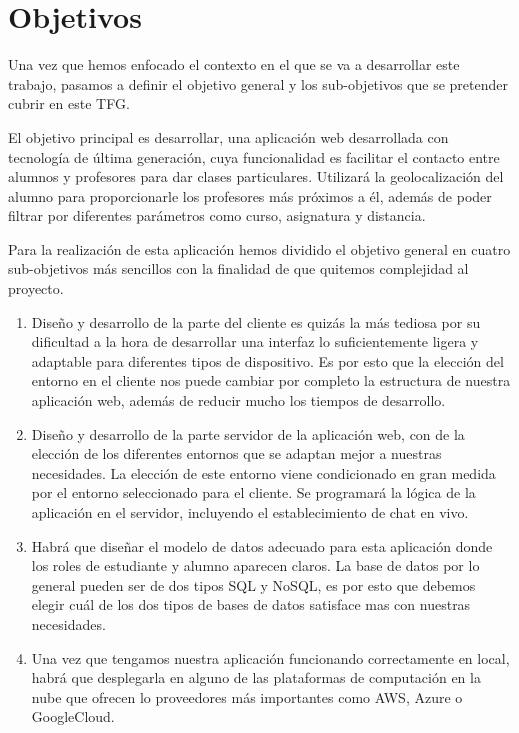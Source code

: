 \chapter{Objetivos}
Una vez que hemos enfocado el contexto en el que se va a desarrollar este trabajo, pasamos a definir el objetivo general y los sub-objetivos que se pretender cubrir en este TFG.

El objetivo principal es desarrollar, una aplicación web desarrollada con tecnología de última  generación, cuya funcionalidad es facilitar el contacto entre alumnos y profesores para dar clases particulares. Utilizará la geolocalización del alumno para proporcionarle los profesores más próximos a él, además de poder filtrar por diferentes parámetros como curso, asignatura y distancia.

Para la realización de esta aplicación hemos dividido el objetivo general en cuatro sub-objetivos más sencillos con la finalidad de que quitemos complejidad al proyecto.
\begin{enumerate}

    \item Diseño y desarrollo de la parte del cliente es quizás la más tediosa por su dificultad a la hora de desarrollar una interfaz lo suficientemente ligera y adaptable para diferentes tipos de dispositivo. Es por esto que la elección del entorno en el cliente nos puede cambiar por completo la estructura de nuestra aplicación web, además de reducir mucho los tiempos de desarrollo.

    \item Diseño y desarrollo de la parte servidor de la aplicación web, con de la elección de los diferentes entornos que se adaptan mejor a nuestras necesidades. La elección de este entorno viene condicionado en gran medida por el entorno seleccionado para el cliente. Se programará la lógica de la aplicación en el servidor, incluyendo el establecimiento de chat en vivo.

    \item Habrá que diseñar el modelo de datos adecuado para esta aplicación donde los roles de estudiante y alumno aparecen claros. La base de datos por lo general pueden ser de dos tipos SQL y NoSQL, es por esto que debemos elegir cuál de los dos tipos de bases de datos satisface mas con nuestras necesidades.

    \item Una vez que tengamos nuestra aplicación funcionando correctamente en local, habrá que desplegarla en alguno de las plataformas de computación en la nube que ofrecen lo proveedores más importantes como AWS, Azure o GoogleCloud.


\end{enumerate}
